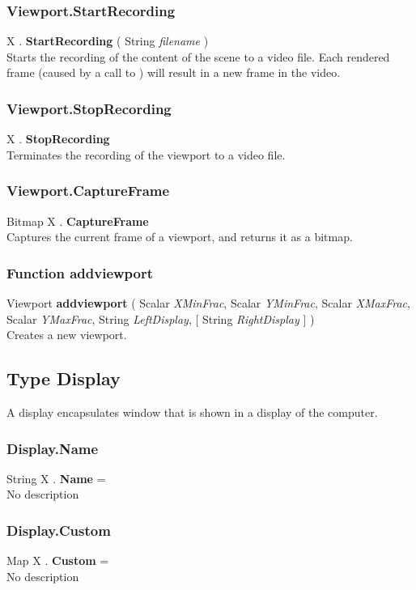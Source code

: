 \subsubsection{Viewport.StartRecording \label{F:Viewport:StartRecording}}
X . \textbf{StartRecording} ( String \textit{filename} ) \\
Starts the recording of the content of the scene to a video file. Each rendered frame (caused by a call to ) will result in a new frame in the video.

\subsubsection{Viewport.StopRecording \label{F:Viewport:StopRecording}}
X . \textbf{StopRecording} \\
Terminates the recording of the viewport to a video file.

\subsubsection{Viewport.CaptureFrame \label{F:Viewport:CaptureFrame}}
Bitmap X . \textbf{CaptureFrame} \\
Captures the current frame of a viewport, and returns it as a bitmap.

\subsubsection{Function addviewport \label{F:addviewport}}
Viewport \textbf{addviewport} ( Scalar \textit{XMinFrac}, Scalar \textit{YMinFrac}, Scalar \textit{XMaxFrac}, Scalar \textit{YMaxFrac}, String \textit{LeftDisplay},  [ String \textit{RightDisplay} ] ) \\
Creates a new viewport.

\subsection{Type Display \label{T:Display}}
A display encapsulates window that is shown in a display of the computer.

\subsubsection{Display.Name \label{F:Display:Name}}
String X . \textbf{Name} = \\
No description

\subsubsection{Display.Custom \label{F:Display:Custom}}
Map X . \textbf{Custom} = \\
No description

